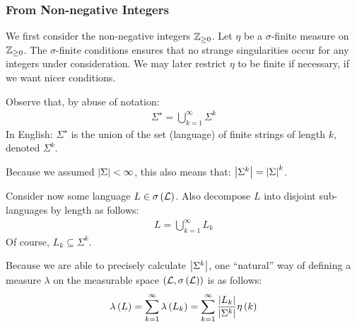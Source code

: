 \subsubsection{From Non-negative Integers}
We first consider the non-negative integers \(\mathbb{Z}_{\geq 0}\).
Let \(\eta\) be a \(\sigma\)-finite measure on \(\mathbb{Z}_{\geq 0}\).
The \(\sigma\)-finite conditions ensures that no strange singularities
occur for any integers under consideration.
We may later restrict \(\eta\) to be finite if necessary,
if we want nicer conditions.

Observe that, by abuse of notation:
\begin{align*}
  \Sigma^\star =
    \bigcup_{k = 1}^{\infty} \Sigma^k
\end{align*}
In English: \(\Sigma^\star\) is the union of the set (language) of finite
strings of length \(k\), denoted \(\Sigma^k\).

Because we assumed \(\left\lvert\Sigma\right\rvert < \infty\), this also means that:
\(\left\lvert\Sigma^k\right\rvert = \left\lvert\Sigma\right\rvert^k\).

Consider now some language \(L \in \sigma\left(\mathcal{L}\right)\).
Also decompose \(L\) into disjoint sub-languages by length as follows:
\begin{align*}
  L = \bigcup_{k = 1}^{\infty} L_k
\end{align*}
Of course, \(L_k \subseteq \Sigma^k\).

Because we are able to precisely calculate \(\left\lvert\Sigma^k\right\rvert\),
one ``natural'' way of defining a measure \(\lambda\) on
the measurable space \(\left(\mathcal{L}, \sigma\left(\mathcal{L}\right)\right)\)
is as follows:
\begin{align*}
  \lambda\left(L\right)
    = \sum_{k = 1}^{\infty} \lambda\left(L_k\right)
    = \sum_{k = 1}^{\infty} \frac{\left\lvert L_k\right\rvert}{\left\lvert\Sigma^k\right\rvert} \eta\left(k\right)
\end{align*}

